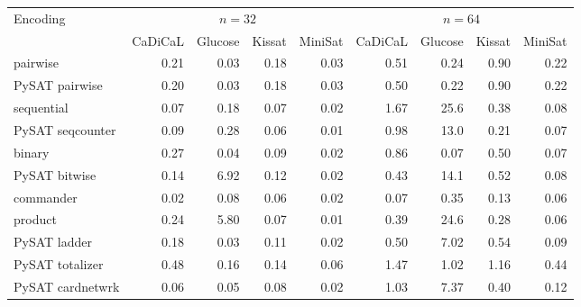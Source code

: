 \begin{tabular}{@{}lrrrrrrrr@{}}
\toprule
Encoding & \multicolumn{4}{c}{$n=32$} & \multicolumn{4}{c}{$n=64$} \\
\cmidrule(lr){2-5}\cmidrule(lr){6-9}
 & CaDiCaL & Glucose & Kissat & MiniSat & CaDiCaL & Glucose & Kissat & MiniSat \\
\midrule
pairwise & 0.21 & 0.03 & 0.18 & 0.03 & 0.51 & 0.24 & 0.90 & 0.22 \\
PySAT pairwise & 0.20 & 0.03 & 0.18 & 0.03 & 0.50 & 0.22 & 0.90 & 0.22 \\
sequential & 0.07 & 0.18 & 0.07 & 0.02 & 1.67 & 25.6 & 0.38 & 0.08 \\
PySAT seqcounter & 0.09 & 0.28 & 0.06 & 0.01 & 0.98 & 13.0 & 0.21 & 0.07 \\
binary & 0.27 & 0.04 & 0.09 & 0.02 & 0.86 & 0.07 & 0.50 & 0.07 \\
PySAT bitwise & 0.14 & 6.92 & 0.12 & 0.02 & 0.43 & 14.1 & 0.52 & 0.08 \\
commander & 0.02 & 0.08 & 0.06 & 0.02 & 0.07 & 0.35 & 0.13 & 0.06 \\
product & 0.24 & 5.80 & 0.07 & 0.01 & 0.39 & 24.6 & 0.28 & 0.06 \\
\midrule
PySAT ladder & 0.18 & 0.03 & 0.11 & 0.02 & 0.50 & 7.02 & 0.54 & 0.09 \\
PySAT totalizer & 0.48 & 0.16 & 0.14 & 0.06 & 1.47 & 1.02 & 1.16 & 0.44 \\
PySAT cardnetwrk & 0.06 & 0.05 & 0.08 & 0.02 & 1.03 & 7.37 & 0.40 & 0.12 \\
\bottomrule
\end{tabular}
